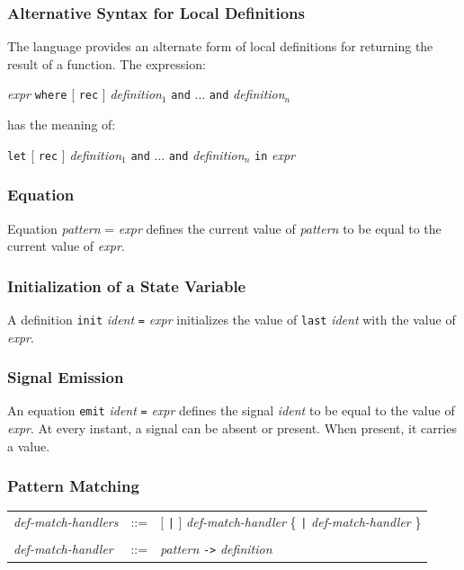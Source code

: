\documentclass[11pt,titlepage,twoside]{report}
\newcommand{\Let}{\mbox{{\tt let}}}
\newcommand{\Rec}{\mbox{{\tt rec}}}
\newcommand{\In}{\mbox{{\tt in}}}
\newcommand{\And}{\mbox{{\tt and}}}
\newcommand{\Emit}{\mbox{{\tt emit}}}
\newcommand{\Last}{\mbox{{\tt last}}}
\newcommand{\Minusgreater}{\mbox{{\tt ->}}}
\newcommand{\Where}{\mbox{{\tt where}}}
\newcommand{\term}[1]{{\tt #1}}
\newcommand{\nterm}[1]{{\em #1}}
\begin{document}
\subsubsection{Alternative Syntax for Local Definitions}
The language provides an alternate form of local definitions for returning
the result of a function. The expression:
\begin{center}
\nterm{expr} \term{\Where} [ \term{\Rec} ]
  \nterm{definition}$_1$ \term{\And} ... \term{\And} \nterm{definition}$_n$ 
\end{center}
has the meaning of:
\begin{center}
  \term{\Let} [ \term{\Rec} ] 
  \nterm{definition}$_1$ \term{\And} ... \term{\And} \nterm{definition}$_n$
  \term{\In} \nterm{expr}
\end{center}

\subsubsection{Equation}
Equation \nterm{pattern} = \nterm{expr} defines the current
value of \nterm{pattern} to be equal to the current value of \nterm{expr}.

\subsubsection{Initialization of a State Variable}
A definition \term{init} \nterm{ident} \term{=} \nterm{expr} initializes
the value of \term{\Last} \nterm{ident} with the
value of \nterm{expr}.

\subsubsection{Signal Emission}
An equation \term{\Emit} \nterm{ident} \term{=} \nterm{expr} defines
the signal \nterm{ident} to be equal to the value of \nterm{expr}. At
every instant, a signal can be absent or present. When present, it carries
a value.

\subsubsection{Pattern Matching}

\begin{center}
\begin{tabular}{lcl}
\nterm{def-match-handlers}
   & ::=        & [ \term{|} ] \nterm{def-match-handler}
                  \{ \term{|} \nterm{def-match-handler} \} 
\\ \\
\nterm{def-match-handler}
   & ::=        & \nterm{pattern} \term{\Minusgreater} \nterm{definition}
\end{tabular}
\end{center}
\end{document}

